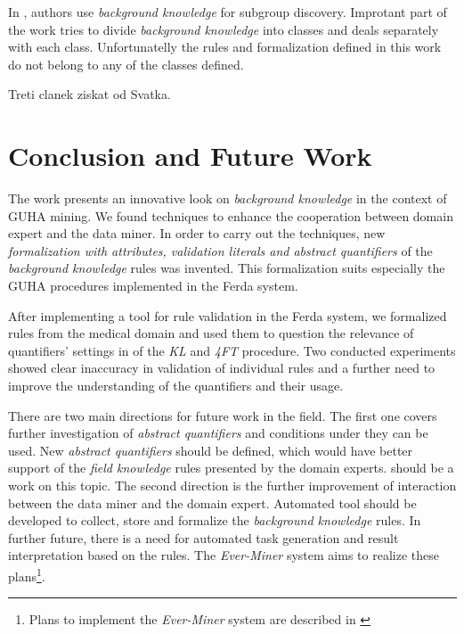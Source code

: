 \documentclass{llncs}
\begin{document}
In \cite{Puppe}, authors use \emph{background knowledge} for subgroup discovery.
Improtant part of the work tries to divide \emph{background knowledge} into classes and deals
separately with each class. Unfortunatelly the rules and formalization defined in
this work do not belong to any of the classes defined.

Treti clanek ziskat od Svatka. 

\section{Conclusion and Future Work}
\label{section:conclusion}

The work presents an innovative look on \emph{background knowledge} in the context
of GUHA mining. We found techniques to enhance the cooperation between domain expert
and the data miner. In order to carry out the techniques, new 
\emph{formalization with attributes, validation literals and abstract quantifiers}
of the \emph{background knowledge} rules was invented. This formalization suits
especially the GUHA procedures implemented in the Ferda system.

After implementing a tool for rule validation in the Ferda system, we formalized
rules from the medical domain and used them to question the relevance of quantifiers'
settings in of the \emph{KL} and \emph{4FT} procedure. Two conducted experiments
showed clear inaccuracy in validation of individual rules and a further need to
improve the understanding of the quantifiers and their usage. 

There are two main directions for future work in the field. The first one covers
further investigation of \emph{abstract quantifiers} and conditions under they
can be used. New \emph{abstract quantifiers} should be defined, which would have
better support of the \emph{field knowledge} rules presented by the domain experts.
\cite{Kupka} should be a work on this topic. The second direction is the further
improvement of interaction between the data miner and the domain expert. Automated
tool should be developed to collect, store and formalize the \emph{background
knowledge} rules. In further future, there is a need for automated task generation
and result interpretation based on the rules. The \emph{Ever-Miner} system 
aims to realize these plans\footnote{Plans to implement the \emph{Ever-Miner} system
are described in \cite{Diplomka}}. 
\end{document}
